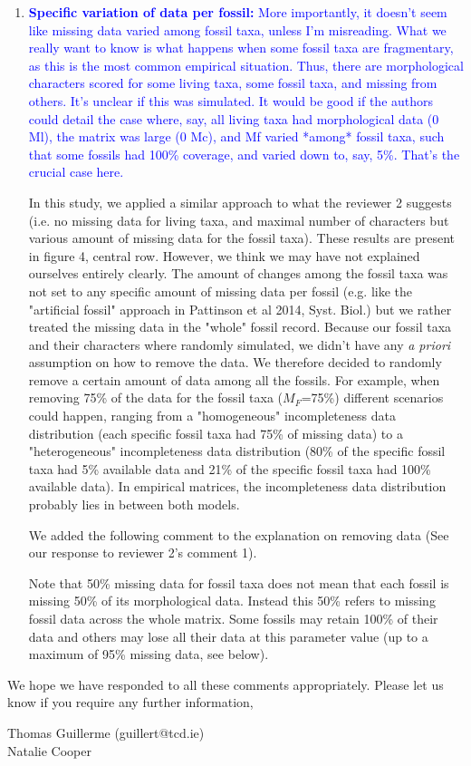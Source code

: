 \documentclass[12pt,letterpaper]{article}
\begin{document}
\begin{enumerate}
\item{\textcolor{blue}{\textbf{Specific variation of data per fossil:} More importantly, it doesn't seem like missing data varied among fossil taxa, unless I'm misreading. What we really want to know is what happens when some fossil taxa are fragmentary, as this is the most common empirical situation. Thus, there are morphological characters scored for some living taxa, some fossil taxa, and missing from others. It's unclear if this was simulated. It would be good if the authors could detail the case where, say, all living taxa had morphological data (0 Ml), the matrix was large (0 Mc), and Mf varied *among* fossil taxa, such that some fossils had 100\% coverage, and varied down to, say, 5\%. That's the crucial case here.}}

In this study, we applied a similar approach to what the reviewer 2 suggests (i.e. no missing data for living taxa, and maximal number of characters but various amount of missing data for the fossil taxa). 
These results are present in figure 4, central row.
However, we think we may have not explained ourselves entirely clearly. The amount of changes among the fossil taxa was not set to any specific amount of missing data per fossil (e.g. like the "artificial fossil" approach in Pattinson et al 2014, Syst. Biol.) but we rather treated the missing data in the "whole" fossil record.
Because our fossil taxa and their characters where randomly simulated, we didn't have any \textit{a priori} assumption on how to remove the data.
We therefore decided to randomly remove a certain amount of data among all the fossils.
For example, when removing 75\% of the data for the fossil taxa ($M_F$=75\%) different scenarios could happen, ranging from a "homogeneous" incompleteness data distribution (each specific fossil taxa had 75\% of missing data) to a "heterogeneous" incompleteness data distribution  (80\% of the specific fossil taxa had 5\% available data and 21\% of the specific fossil taxa had 100\% available data).
In empirical matrices, the incompleteness data distribution probably lies in between both models.

We added the following comment to the explanation on removing data (See our response to reviewer 2's comment 1).

Note that 50\% missing data for fossil taxa does not mean that each fossil is missing 50\% of its morphological data.
Instead this 50\% refers to missing fossil data across the whole matrix.
Some fossils may retain 100\% of their data and others may lose all their data at this parameter value (up to a maximum of 95\% missing data, see below).

\end{enumerate}

We hope we have responded to all these comments appropriately. Please let us know if you require any further information,\\
\bigskip

Thomas Guillerme (guillert@tcd.ie)\\
Natalie Cooper
\end{document}
